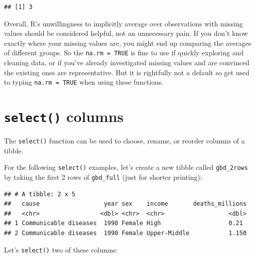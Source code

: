 \documentclass[
  12pt,
  krantz2]{krantz}
\makeatletter
\newenvironment{Shaded}{\begin{snugshade}}{\end{snugshade}}
\newcommand{\DecValTok}[1]{\textcolor[rgb]{0.00,0.00,0.81}{#1}}
\newcommand{\KeywordTok}[1]{\textcolor[rgb]{0.13,0.29,0.53}{\textbf{#1}}}
\newcommand{\NormalTok}[1]{#1}
\newcommand{\OperatorTok}[1]{\textcolor[rgb]{0.81,0.36,0.00}{\textbf{#1}}}
\newcommand{\StringTok}[1]{\textcolor[rgb]{0.31,0.60,0.02}{#1}}
\newenvironment{kframe}{%
\medskip{}
\setlength{\fboxsep}{.8em}
 \def\at@end@of@kframe{}%
 \ifinner\ifhmode%
  \def\at@end@of@kframe{\end{minipage}}%
  \begin{minipage}{\columnwidth}%
 \fi\fi%
 \def\FrameCommand##1{\hskip\@totalleftmargin \hskip-\fboxsep
 \colorbox{shadecolor}{##1}\hskip-\fboxsep
     \hskip-\linewidth \hskip-\@totalleftmargin \hskip\columnwidth}%
 \MakeFramed {\advance\hsize-\width
   \@totalleftmargin\z@ \linewidth\hsize
   \@setminipage}}%
 {\par\unskip\endMakeFramed%
 \at@end@of@kframe}
\renewenvironment{Shaded}{\begin{kframe}}{\end{kframe}}
\makeatother
\begin{document}
\begin{verbatim}
## [1] 3
\end{verbatim}

Overall, R's unwillingness to implicitly average over observations with missing values should be considered helpful, not an unnecessary pain.
If you don't know exactly where your missing values are, you might end up comparing the averages of different groups.
So the \texttt{na.rm\ =\ TRUE} is fine to use if quickly exploring and cleaning data, or if you've already investigated missing values and are convinced the existing ones are representative.
But it is rightfully not a default so get used to typing \texttt{na.rm\ =\ TRUE} when using these functions.

\hypertarget{select-columns}{%
\section{\texorpdfstring{\texttt{select()} columns}{select() columns}}\label{select-columns}}


The \texttt{select()} function can be used to choose, rename, or reorder columns of a tibble.

For the following \texttt{select()} examples, let's create a new tibble called \texttt{gbd\_2rows} by taking the first 2 rows of \texttt{gbd\_full} (just for shorter printing):

\begin{Shaded}
\end{Shaded}

\begin{verbatim}
## # A tibble: 2 x 5
##   cause                  year sex    income       deaths_millions
##   <chr>                 <dbl> <chr>  <chr>                  <dbl>
## 1 Communicable diseases  1990 Female High                   0.21 
## 2 Communicable diseases  1990 Female Upper-Middle           1.150
\end{verbatim}

Let's \texttt{select()} two of these columns:
\end{document}
